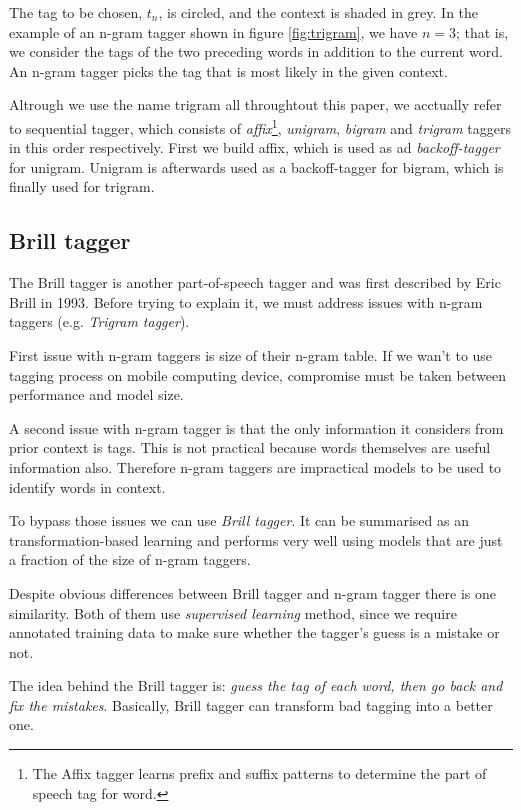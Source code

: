 \documentclass[10pt, conference, compsocconf]{IEEEtran}
\begin{document}
The tag to be chosen, $t_{n}$, is circled, and the context is shaded in grey.
In the example of an n-gram tagger shown in figure \ref{fig:trigram}, we have $n=3$; that is, we consider the tags of the two preceding words in addition to the current word.
An n-gram tagger picks the tag that is most likely in the given context.
\par
Altrough we use the name trigram all throughtout this paper, we acctually refer to sequential tagger, which consists of
\textit{affix}\footnote{The Affix tagger learns prefix and suffix patterns to determine the part of speech tag for word.}, \textit{unigram}, \textit{bigram} and \textit{trigram} taggers in this order respectively. First we build affix, which is used as ad \textit{backoff-tagger} for unigram. Unigram is afterwards used as a backoff-tagger for bigram, which is finally used for trigram.

\subsection{Brill tagger} %

The Brill tagger is another part-of-speech tagger and was first described by Eric Brill in 1993. Before trying to explain it, we must address issues with n-gram taggers (e.g. \textit{Trigram tagger}).

First issue with n-gram taggers is size of their n-gram table. If we wan't to use tagging process on mobile computing device, compromise must be taken between performance and model size. 

A second issue with n-gram tagger is that the only information it considers from prior context is tags. This is not practical because words themselves are useful information also. Therefore n-gram taggers are impractical models to be used to identify words in context. 
  
To bypass those issues we can use \textit{Brill tagger}. It can be summarised as an transformation-based learning and performs very well using models that are just a fraction of the size of n-gram taggers.

Despite obvious differences between Brill tagger and n-gram tagger there is one similarity. Both of them use \textit{supervised learning} method, since we require annotated training data to make sure whether the tagger's guess is a mistake or not.

The idea behind the Brill tagger is: \textit{guess the tag of each word, then go back and fix the mistakes}. Basically, Brill tagger can transform bad tagging into a better one. 
\end{document}
